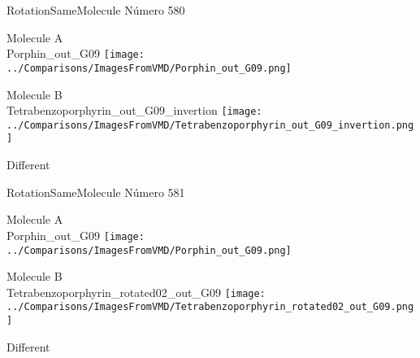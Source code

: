 \vtab[-3cm]
\begin{center}
{\large RotationSameMolecule \tab Número 580}
\end{center}
\begin{multicols}{2}
\begin{center}
Molecule A \\ 
Porphin\_out\_G09
\texttt{[image: ../Comparisons/ImagesFromVMD/Porphin\_out\_G09.png]}
\\
\vtab

\columnbreak
Molecule B \\ 
Tetrabenzoporphyrin\_out\_G09\_invertion
\texttt{[image: ../Comparisons/ImagesFromVMD/Tetrabenzoporphyrin\_out\_G09\_invertion.png]}
\\
\vtab


\end{center}
\end{multicols}
\begin{center}
\textcolor{NavyBlue}{\Large Different}
\end{center}

 \newpage

\vtab[-3cm]
\begin{center}
{\large RotationSameMolecule \tab Número 581}
\end{center}
\begin{multicols}{2}
\begin{center}
Molecule A \\ 
Porphin\_out\_G09
\texttt{[image: ../Comparisons/ImagesFromVMD/Porphin\_out\_G09.png]}
\\
\vtab

\columnbreak
Molecule B \\ 
Tetrabenzoporphyrin\_rotated02\_out\_G09
\texttt{[image: ../Comparisons/ImagesFromVMD/Tetrabenzoporphyrin\_rotated02\_out\_G09.png]}
\\
\vtab


\end{center}
\end{multicols}
\begin{center}
\textcolor{NavyBlue}{\Large Different}
\end{center}

 \newpage

